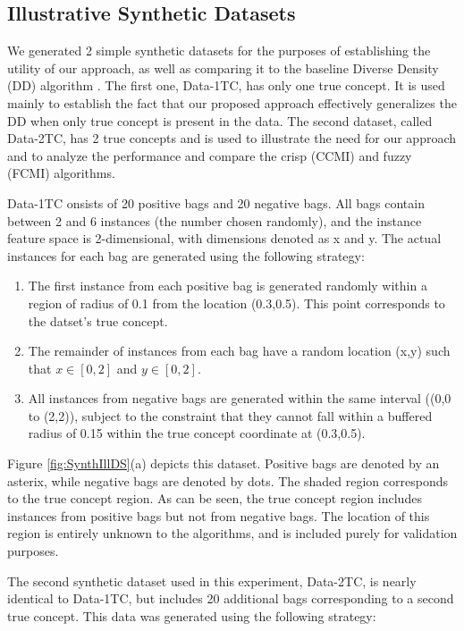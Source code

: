 \documentclass[12pt,dvips]{report}
\numberwithin{equation}{section}
\begin{document}
\subsection{Illustrative Synthetic Datasets} \label{subsec:Synth1Data}

We generated 2 simple synthetic datasets for the purposes of establishing the utility of our approach, as well as comparing it to the baseline Diverse Density (DD) algorithm \cite{maro98}.  The first one, Data-1TC, has only one true concept.  It is used mainly to establish the fact that our proposed approach effectively generalizes the DD when only true concept is present in the data.  The second dataset, called Data-2TC, has 2 true concepts and is used to illustrate the need for our approach and to analyze the performance and compare the crisp (CCMI) and fuzzy (FCMI) algorithms.

Data-1TC onsists of 20 positive bags and 20 negative bags.  All bags contain between 2 and 6 instances (the number chosen randomly), and the instance feature space is 2-dimensional, with dimensions denoted as x and y.  The actual instances for each bag are generated using the following strategy:
\begin{enumerate}
  \item The first instance from each positive bag is generated randomly within a region of radius of 0.1 from the location (0.3,0.5).  This point corresponds to the datset's true concept.
  \item The remainder of instances from each bag have a random location (x,y) such that $x\in[0,2]$ and $y\in[0,2]$.
  \item All instances from negative bags are generated within the same interval ((0,0 to (2,2)), subject to the constraint that they cannot fall within a buffered radius of 0.15 within the true concept coordinate at (0.3,0.5).
\end{enumerate}  
Figure \ref{fig:SynthIllDS}(a) depicts this dataset.  Positive bags are denoted by an asterix, while negative bags are denoted by dots.  The shaded region corresponds to the true concept region.  As can be seen, the true concept region includes instances from positive bags but not from negative bags.  The location of this region is entirely unknown to the algorithms, and is included purely for validation purposes.

The second synthetic dataset used in this experiment, Data-2TC, is nearly identical to Data-1TC, but includes 20 additional bags corresponding to a second true concept.  This data was generated using the following strategy:
\end{document}
